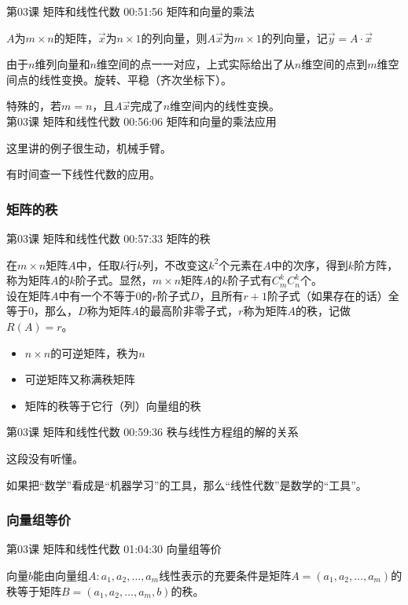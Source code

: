 \documentclass[UTF8]{ctexart}
\begin{document}
第03课 矩阵和线性代数 00:51:56 矩阵和向量的乘法

$A$为$m \times n$的矩阵，$\vec{x}$为$n \times 1$的列向量，则$A\vec{x}$为$m \times 1$的列向量，记$\vec{y}=A \cdot \vec{x}$

由于$n$维列向量和$n$维空间的点一一对应，上式实际给出了从$n$维空间的点到$m$维空间点的线性变换。旋转、平稳（齐次坐标下）。

特殊的，若$m = n$，且$A\vec{x}$完成了$n$维空间内的线性变换。\\

第03课 矩阵和线性代数 00:56:06 矩阵和向量的乘法应用

这里讲的例子很生动，机械手臂。

有时间查一下线性代数的应用。


\subsubsection{矩阵的秩}

第03课 矩阵和线性代数 00:57:33 矩阵的秩

在$m \times n$矩阵$A$中，任取$k$行$k$列，不改变这$k^{2}$个元素在$A$中的次序，得到$k$阶方阵，称为矩阵$A$的$k$阶子式。显然，$m \times n$矩阵$A$的$k$阶子式有$C_{m}^{k}C_{n}^{k}$个。\\

设在矩阵$A$中有一个不等于0的$r$阶子式$D$，且所有$r+1$阶子式（如果存在的话）全等于0，那么，$D$称为矩阵$A$的最高阶非零子式，$r$称为矩阵$A$的秩，记做$R(A)=r$。

\begin{itemize}
\item $n \times n$的可逆矩阵，秩为$n$
\item 可逆矩阵又称满秩矩阵
\item 矩阵的秩等于它行（列）向量组的秩
\end{itemize}

第03课 矩阵和线性代数 00:59:36 秩与线性方程组的解的关系

这段没有听懂。

如果把“数学”看成是“机器学习”的工具，那么“线性代数”是数学的“工具”。

\subsubsection{向量组等价}

第03课 矩阵和线性代数 01:04:30 向量组等价

向量$b$能由向量组$A:a_{1},a_{2},\dots,a_{m}$线性表示的充要条件是矩阵$A=(a_{1},a_{2},\dots,a_{m})$的秩等于矩阵$B=(a_{1},a_{2},\dots,a_{m},b)$的秩。
\end{document}
